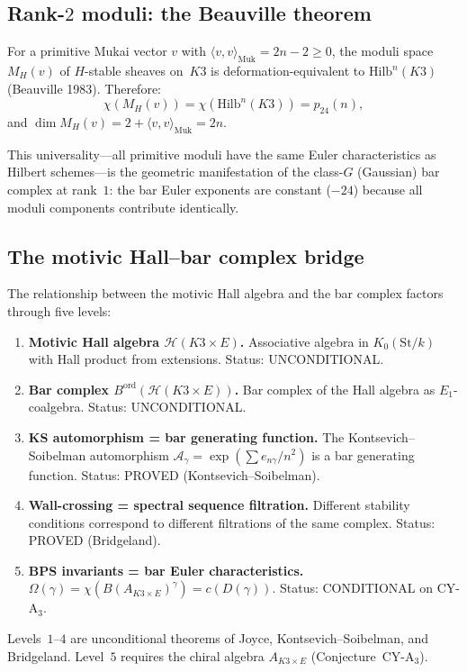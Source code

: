 \subsection{Rank-$2$ moduli: the Beauville theorem}
\label{subsec:k3e-rank2-beauville}

\begin{proposition}
\label{prop:k3e-beauville}
\ClaimStatusProvedElsewhere
For a primitive Mukai vector $v$ with $\langle v, v \rangle_{\mathrm{Muk}} = 2n-2 \geq 0$, the moduli space $M_H(v)$ of $H$-stable sheaves on~$K3$ is deformation-equivalent to $\mathrm{Hilb}^n(K3)$ \textup{(Beauville 1983)}.  Therefore:
\[
  \chi(M_H(v)) = \chi(\mathrm{Hilb}^n(K3)) = p_{24}(n),
\]
and $\dim M_H(v) = 2 + \langle v, v \rangle_{\mathrm{Muk}} = 2n$.
\end{proposition}

This universality---all primitive moduli have the same Euler characteristics as Hilbert schemes---is the geometric manifestation of the class-$G$ (Gaussian) bar complex at rank~$1$: the bar Euler exponents are constant ($-24$) because all moduli components contribute identically.

\subsection{The motivic Hall--bar complex bridge}
\label{subsec:k3e-hall-bar-bridge}

The relationship between the motivic Hall algebra and the bar complex factors through five levels:

\begin{conjecture}
\label{conj:k3e-five-level-bridge}
\begin{enumerate}[label=\textup{Level \arabic*.}, leftmargin=*]
  \item \textbf{Motivic Hall algebra $\mathcal{H}(K3 \times E)$.} Associative algebra in $K_0(\mathrm{St}/k)$ with Hall product from extensions. \textup{Status: UNCONDITIONAL.}
  \item \textbf{Bar complex $B^{\mathrm{ord}}(\mathcal{H}(K3 \times E))$.} Bar complex of the Hall algebra as $E_1$-coalgebra. \textup{Status: UNCONDITIONAL.}
  \item \textbf{KS automorphism = bar generating function.} The Kontsevich--Soibelman automorphism $\mathcal{A}_\gamma = \exp(\sum e_{n\gamma}/n^2)$ is a bar generating function. \textup{Status: PROVED (Kontsevich--Soibelman).}
  \item \textbf{Wall-crossing = spectral sequence filtration.} Different stability conditions correspond to different filtrations of the same complex. \textup{Status: PROVED (Bridgeland).}
  \item \textbf{BPS invariants = bar Euler characteristics.} $\Omega(\gamma) = \chi(B(A_{K3 \times E})^\gamma) = c(D(\gamma))$. \textup{Status: CONDITIONAL on CY-A$_3$.}
\end{enumerate}
Levels~$1$--$4$ are unconditional theorems of Joyce, Kontsevich--Soibelman, and Bridgeland. Level~$5$ requires the chiral algebra $A_{K3 \times E}$ (Conjecture~CY-A$_3$).
\end{conjecture}


